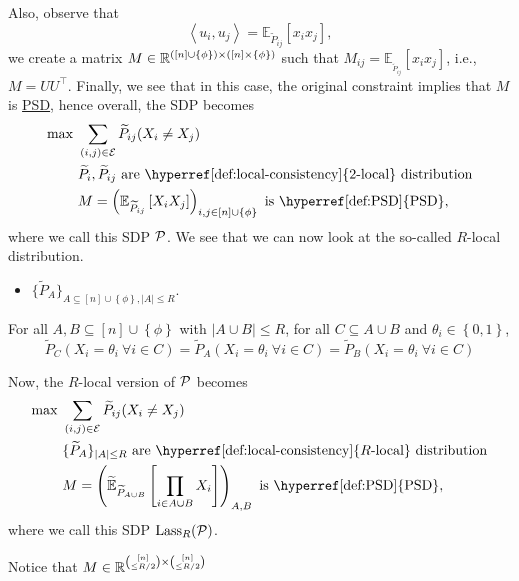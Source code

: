 Also, observe that
\[
	\left\langle u_i, u_j \right\rangle = \mathbb{E}_{\widetilde{P} _{ij}}\left[ x_i x_j\right],
\]
we create a matrix \(M\in \mathbb{\MakeUppercase{r}} ^{([n] \cup \left\{ \phi  \right\} )\times ([n] \times \left\{ \phi  \right\} )}\) such that \(M_{ij} = \mathbb{E}_{_{\widetilde{P} _{ij}}}\left[ x_i x_j\right] \), i.e., \(M = U U ^{\top} \). Finally, we see that in this case, the original constraint implies that \(M\) is \hyperref[def:PSD]{PSD}, hence overall, the SDP becomes
\[
	\begin{aligned}
		\max~ & \sum_{(i, j)\in \mathcal{\MakeUppercase{e}} } \widetilde{P} _{ij} (X_i \neq X_j)                                                                       \\
		      & \widetilde{P} _i, \widetilde{P} _{ij}\text{ are \hyperref[def:local-consistency]{\(2\)-local} distribution}                                            \\
		      & M = \left( \mathbb{E}_{\widetilde{P} _{ij}}\left[X_i X_j \right] \right) _{i, j\in [n]\cup \left\{ \phi  \right\} }\text{ is \hyperref[def:PSD]{PSD}},
	\end{aligned}
\]
where we call this SDP \(\mathcal{\MakeUppercase{p}} \). We see that we can now look at the so-called \(R\)-local distribution.
\begin{itemize}
	\item \(\{ \widetilde{P} _A \}_{A \subseteq [n] \cup \left\{ \phi  \right\}, \left\vert A \right\vert \leq R} \).
\end{itemize}

\begin{definition}
	For all \(A, B \subseteq [n]\cup \left\{ \phi  \right\} \) with \(\left\vert A \cup B \right\vert \leq R\), for all \(C \subseteq A \cup B\) and \(\theta _i \in \left\{ 0, 1 \right\} \),
	\[
		\widetilde{P} _C (X_i = \theta _i\ \forall i\in C)
		= \widetilde{P} _A (X_i = \theta _i\ \forall i\in C)
		= \widetilde{P} _B (X_i = \theta _i\ \forall i\in C)
	\]
\end{definition}

Now, the \(R\)-local version of \(\mathcal{\MakeUppercase{p}} \) becomes
\[
	\begin{aligned}
		\max~ & \sum_{(i, j)\in \mathcal{\MakeUppercase{e}} } \widetilde{P} _{ij} (X_i \neq X_j)                                                                                           \\
		      & \{\widetilde{P} _A\}_{\left\vert A \right\vert \leq R} \text{ are \hyperref[def:local-consistency]{\(R\)-local} distribution}                                              \\
		      & M = \left( \widetilde{\mathbb{\MakeUppercase{e}} }_{\widetilde{P} _{A \cup B}} \left[ \prod_{i\in A \cup B} X_i \right] \right) _{A, B}\text{ is \hyperref[def:PSD]{PSD}},
	\end{aligned}
\]
where we call this SDP \(\mathop{\mathrm{Lass}}_R(\mathcal{\MakeUppercase{p}} )\).

\begin{note}
	Notice that \(M\in \mathbb{\MakeUppercase{r}} ^{\binom{[n]}{\leq R / 2} \times \binom{[n]}{\leq R / 2}}\)
\end{note}